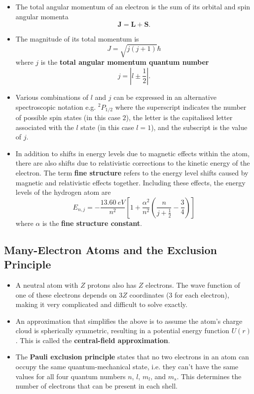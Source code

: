 \documentclass{article}
\begin{document}
\begin{itemize}
  \item The total angular momentum of an electron is the sum of its orbital and spin angular momenta \[\mathbf{J} = \mathbf{L} + \mathbf{S}.\]

  \item The magnitude of its total momentum is \[J = \sqrt{j (j + 1)} \hbar\] where $j$ is the \textbf{total angular momentum quantum number} \[j = \left| l \pm \frac{1}{2} \right|.\]

  \item Various combinations of $l$ and $j$ can be expressed in an alternative spectroscopic notation e.g. $^2 P_{1 / 2}$ where the superscript indicates the number of possible spin states (in this case $2$), the letter is the capitalised letter associated with the $l$ state (in this case $l = 1$), and the subscript is the value of $j$.

  \item In addition to shifts in energy levels due to magnetic effects within the atom, there are also shifts due to relativistic corrections to the kinetic energy of the electron. The term \textbf{fine structure} refers to the energy level shifts caused by magnetic and relativistic effects together. Including these effects, the energy levels of the hydrogen atom are \[E_{n,j} = -\frac{\qty{13.60}{eV}}{n^2} \left[ 1 + \frac{\alpha^2}{n^2} \left( \frac{n}{j + \frac{1}{2}} - \frac{3}{4} \right) \right]\] where $\alpha$ is the \textbf{fine structure constant}.
\end{itemize}

\subsection{Many-Electron Atoms and the Exclusion Principle}

\begin{itemize}
  \item A neutral atom with $Z$ protons also has $Z$ electrons. The wave function of one of these electrons depends on $3 Z$ coordinates ($3$ for each electron), making it very complicated and difficult to solve exactly.

  \item An approximation that simplifies the above is to assume the atom's charge cloud is spherically symmetric, resulting in a potential energy function $U(r)$. This is called the \textbf{central-field approximation}.

  \item The \textbf{Pauli exclusion principle} states that no two electrons in an atom can occupy the same quantum-mechanical state, i.e. they can't have the same values for all four quantum numbers $n$, $l$, $m_l$, and $m_s$. This determines the number of electrons that can be present in each shell.
\end{itemize}
\end{document}

